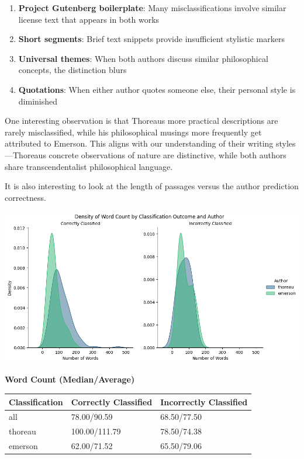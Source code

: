 \documentclass[
]{article}
\begin{document}
\begin{enumerate}
\def\labelenumi{\arabic{enumi}.}
\item
  \textbf{Project Gutenberg boilerplate}: Many misclassifications
  involve similar license text that appears in both works
\item
  \textbf{Short segments}: Brief text snippets provide insufficient
  stylistic markers
\item
  \textbf{Universal themes}: When both authors discuss similar
  philosophical concepts, the distinction blurs
\item
  \textbf{Quotations}: When either author quotes someone else, their
  personal style is diminished
\end{enumerate}

One interesting observation is that Thoreau\textquotesingle s more
practical descriptions are rarely misclassified, while his philosophical
musings more frequently get attributed to Emerson. This aligns with our
understanding of their writing styles---Thoreau\textquotesingle s
concrete observations of nature are distinctive, while both authors
share transcendentalist philosophical language.

It is also interesting to look at the length of passages versus the
author prediction correctness.

\includegraphics{density_plots.png}

\textbf{Word Count (Median/Average)}

\begin{longtable}[]{@{}lll@{}}
\toprule\noalign{}
Classification & Correctly Classified & Incorrectly Classified \\
\midrule\noalign{}
\endhead
\bottomrule\noalign{}
\endlastfoot
all & 78.00/90.59 & 68.50/77.50 \\
thoreau & 100.00/111.79 & 78.50/74.38 \\
emerson & 62.00/71.52 & 65.50/79.06 \\
\end{longtable}
\end{document}

